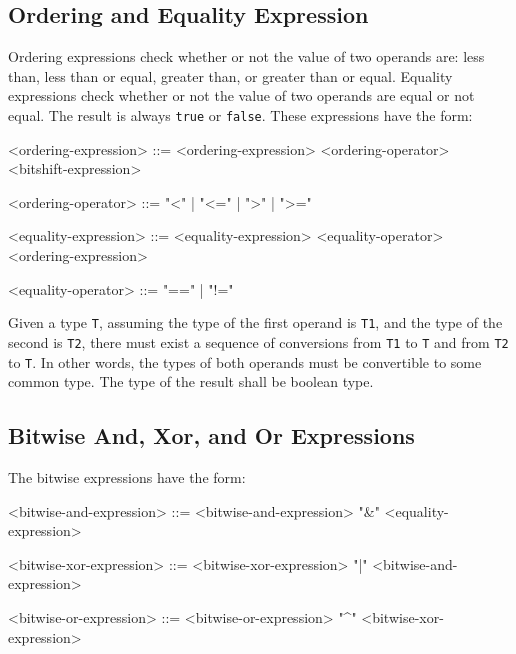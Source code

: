 \subsection{Ordering and Equality Expression} \label{guide:ordering_expr}

Ordering expressions check whether or not the value of two operands are: less than, less than or equal, greater than, or greater than or equal. Equality expressions check whether or not the value of two operands are equal or not equal. The result is always \texttt{true} or \texttt{false}. These expressions have the form: 

\begin{minip}
\begin{grammar}
<ordering-expression> ::= <ordering-expression> 
<ordering-operator> <bitshift-expression>

<ordering-operator> ::= "<" | "<=" | ">" | ">="

<equality-expression> ::= <equality-expression>
<equality-operator> <ordering-expression>

<equality-operator> ::= "==" | "!="
\end{grammar}
\end{minip}

Given a type \texttt{T}, assuming the type of the first operand is \texttt{T1}, and the type of the second is \texttt{T2}, there must exist a sequence of conversions from \texttt{T1} to \texttt{T} and from \texttt{T2} to \texttt{T}. In other words, the types of both operands must be convertible to some common type. The type of the result shall be boolean type.

\subsection{Bitwise And, Xor, and Or Expressions} \label{guide:bitwise_expr}

The bitwise expressions have the form:

\begin{minip}
\begin{grammar}
<bitwise-and-expression> ::= <bitwise-and-expression> "\&" <equality-expression>

<bitwise-xor-expression> ::= <bitwise-xor-expression> "|" <bitwise-and-expression>

<bitwise-or-expression> ::= <bitwise-or-expression> "^" <bitwise-xor-expression>
\end{grammar}
\end{minip}

